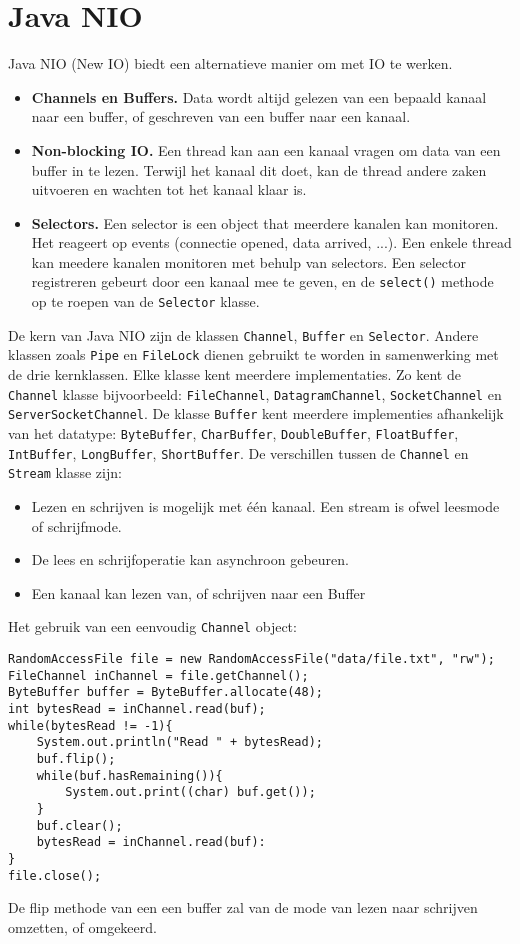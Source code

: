 \documentclass{report}
\begin{document}
\chapter{Java NIO}
Java NIO (New IO) biedt een alternatieve manier om met IO te werken.
\begin{itemize}
    \item \textbf{Channels en Buffers.} Data wordt altijd gelezen van een bepaald kanaal naar een buffer, of geschreven van een buffer naar een kanaal.
    \item \textbf{Non-blocking IO.} Een thread kan aan een kanaal vragen om data van een buffer in te lezen. Terwijl het kanaal dit doet, kan de thread andere zaken uitvoeren en wachten tot het kanaal klaar is.
    \item \textbf{Selectors.} Een selector is een object that meerdere kanalen kan monitoren. Het reageert op events (connectie opened, data arrived, ...). Een enkele thread kan meedere kanalen monitoren met behulp van selectors. Een selector registreren gebeurt door een kanaal mee te geven, en de \texttt{select()} methode op te roepen van de \texttt{Selector} klasse.
\end{itemize}
De kern van Java NIO zijn de klassen \texttt{Channel}, \texttt{Buffer} en \texttt{Selector}. Andere klassen zoals \texttt{Pipe} en \texttt{FileLock} dienen gebruikt te worden in samenwerking met de drie kernklassen. Elke klasse kent meerdere implementaties. Zo kent de \texttt{Channel} klasse bijvoorbeeld: \texttt{FileChannel}, \texttt{DatagramChannel}, \texttt{SocketChannel} en \texttt{ServerSocketChannel}. De klasse \texttt{Buffer} kent meerdere implementies afhankelijk van het datatype: \texttt{ByteBuffer}, \texttt{CharBuffer}, \texttt{DoubleBuffer}, \texttt{FloatBuffer}, \texttt{IntBuffer}, \texttt{LongBuffer}, \texttt{ShortBuffer}. 
De verschillen tussen de \texttt{Channel} en \texttt{Stream} klasse zijn:
\begin{itemize}
    \item Lezen en schrijven is mogelijk met één kanaal. Een stream is ofwel leesmode of schrijfmode.
    \item De lees en schrijfoperatie kan asynchroon gebeuren.
    \item Een kanaal kan lezen van, of schrijven naar een Buffer
\end{itemize}
Het gebruik van een eenvoudig \texttt{Channel} object:
\begin{lstlisting}
RandomAccessFile file = new RandomAccessFile("data/file.txt", "rw");
FileChannel inChannel = file.getChannel();
ByteBuffer buffer = ByteBuffer.allocate(48);
int bytesRead = inChannel.read(buf);
while(bytesRead != -1){
    System.out.println("Read " + bytesRead);
    buf.flip();
    while(buf.hasRemaining()){
        System.out.print((char) buf.get());
    }
    buf.clear();
    bytesRead = inChannel.read(buf):
}
file.close();
\end{lstlisting}
De flip methode van een een buffer zal van de mode van lezen naar schrijven omzetten, of omgekeerd.
\end{document}

